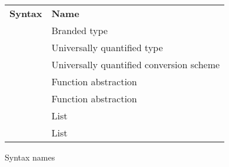 \begin{figure}[p]

\onehalfspacing
\centering
\begin{tabular}{rl}

\textbf{Syntax} & \textbf{Name} \\

\csbrand{\varbrand}{\varty} & Branded type \\
\tyfor{\tyvar}{\varty} & Universally quantified type \\
\csfor{\csvar}{\varcs} & Universally quantified conversion scheme \\
\tyfun{\varty}{\varty} & Function abstraction \\
\csfun{\varcs}{\varcs} & Function abstraction \\
\tylist{\varty} & List \\
\cslist{\varcs} & List \\

\end{tabular}

\caption{Syntax names}
\label{figsyntax2}
\end{figure}
